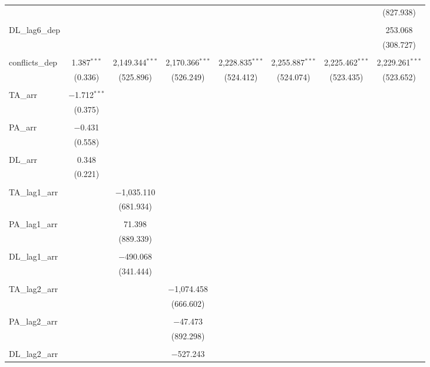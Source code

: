 \begin{table}[!htbp]
\begin{tabular}{@{\extracolsep{5pt}}lccccccc}
  &  &  &  &  &  &  & (827.938) \\ 
  & & & & & & & \\ 
 DL\_lag6\_dep &  &  &  &  &  &  & 253.068 \\ 
  &  &  &  &  &  &  & (308.727) \\ 
  & & & & & & & \\ 
 conflicts\_dep & 1.387$^{***}$ & 2,149.344$^{***}$ & 2,170.366$^{***}$ & 2,228.835$^{***}$ & 2,255.887$^{***}$ & 2,225.462$^{***}$ & 2,229.261$^{***}$ \\ 
  & (0.336) & (525.896) & (526.249) & (524.412) & (524.074) & (523.435) & (523.652) \\ 
  & & & & & & & \\ 
 TA\_arr & $-$1.712$^{***}$ &  &  &  &  &  &  \\ 
  & (0.375) &  &  &  &  &  &  \\ 
  & & & & & & & \\ 
 PA\_arr & $-$0.431 &  &  &  &  &  &  \\ 
  & (0.558) &  &  &  &  &  &  \\ 
  & & & & & & & \\ 
 DL\_arr & 0.348 &  &  &  &  &  &  \\ 
  & (0.221) &  &  &  &  &  &  \\ 
  & & & & & & & \\ 
 TA\_lag1\_arr &  & $-$1,035.110 &  &  &  &  &  \\ 
  &  & (681.934) &  &  &  &  &  \\ 
  & & & & & & & \\ 
 PA\_lag1\_arr &  & 71.398 &  &  &  &  &  \\ 
  &  & (889.339) &  &  &  &  &  \\ 
  & & & & & & & \\ 
 DL\_lag1\_arr &  & $-$490.068 &  &  &  &  &  \\ 
  &  & (341.444) &  &  &  &  &  \\ 
  & & & & & & & \\ 
 TA\_lag2\_arr &  &  & $-$1,074.458 &  &  &  &  \\ 
  &  &  & (666.602) &  &  &  &  \\ 
  & & & & & & & \\ 
 PA\_lag2\_arr &  &  & $-$47.473 &  &  &  &  \\ 
  &  &  & (892.298) &  &  &  &  \\ 
  & & & & & & & \\ 
 DL\_lag2\_arr &  &  & $-$527.243 &  &  &  &  \\ 

\end{tabular}
\end{table}
